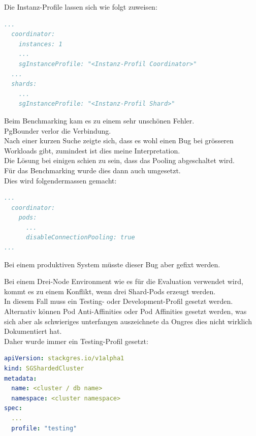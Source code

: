 \begin{flushleft}
    Die Instanz-Profile lassen sich wie folgt zuweisen:
\lstset{style=gra_codestyle}
\begin{lstlisting}[language=yaml, caption=StackGres-Citus - Instanz-Profile, captionpos=b,label={lst:stackgres-citus-sginstanceprofile},breaklines=true]
  ...
  coordinator:
    instances: 1
    ...
    sgInstanceProfile: "<Instanz-Profil Coordinator>"
  ...
  shards:
    ...
    sgInstanceProfile: "<Instanz-Profil Shard>"
\end{lstlisting}
\end{flushleft}
\begin{flushleft}
    Beim Benchmarking kam es zu einem sehr unschönen Fehler.\\
    PgBounder verlor die Verbindung.\\
    Nach einer kurzen Suche zeigte sich, dass es wohl einen Bug bei grösseren Workloads gibt, zumindest ist dies meine Interpretation.\\
    Die Lösung bei einigen schien zu sein, dass das Pooling abgeschaltet wird\cite{JU2PRK9L}.\\
    Für das Benchmarking wurde dies dann auch umgesetzt.\\
    Dies wird folgendermassen gemacht:
\lstset{style=gra_codestyle}
\begin{lstlisting}[language=yaml, caption=StackGres-Citus - StorageClass -PVC Binding,captionpos=b,label={lst:stackgres-citus-disable-pooler},breaklines=true]
...
  coordinator:
    pods:
      ...
      disableConnectionPooling: true
...
\end{lstlisting}
    Bei einem produktiven System müsste dieser Bug aber gefixt werden.
\end{flushleft}
\begin{flushleft}
    Bei einem Drei-Node Environment wie es für die Evaluation verwendet wird,\\kommt es zu einem Konflikt, wenn drei Shard-Pods erzeugt werden.\\
    In diesem Fall muss ein Testing- oder Development-Profil gesetzt werden.\\
    Alternativ können Pod Anti-Affinities oder Pod Affinities gesetzt werden, was sich aber als schwieriges unterfangen auszeichnete da Ongres dies nicht wirklich Dokumentiert hat.\\
    Daher wurde immer ein Testing-Profil gesetzt:
\lstset{style=gra_codestyle}
\begin{lstlisting}[language=yaml, caption=StackGres-Citus - Cluster Profil,captionpos=b,label={lst:stackgres-citus-cluster-profile},breaklines=true]
apiVersion: stackgres.io/v1alpha1
kind: SGShardedCluster
metadata:
  name: <cluster / db name>
  namespace: <cluster namespace>
spec:
  ...
  profile: "testing"
\end{lstlisting}
\end{flushleft}
